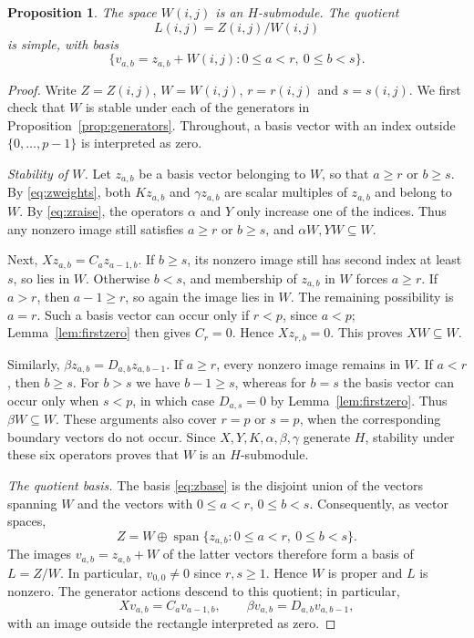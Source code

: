 \documentclass[10pt,oneside]{amsart}
\newcommand{\Span}{\operatorname{span}}
\newtheorem{proposition}{Proposition}[section]
\theoremstyle{definition}
\begin{document}
\begin{proposition}\label{prop:simple}
The space $W(i,j)$ is an $H$-submodule. The quotient
\[
 L(i,j)=Z(i,j)/W(i,j)
\]
is simple, with basis
\[
 \{v_{a,b}=z_{a,b}+W(i,j):0\le a<r,\ 0\le b<s\}.
\]
\end{proposition}
\begin{proof}
Write $Z=Z(i,j)$, $W=W(i,j)$, $r=r(i,j)$ and $s=s(i,j)$.
We first check that $W$ is stable under each of the generators in
Proposition~\ref{prop:generators}. Throughout, a basis vector with an
index outside $\{0,\ldots,p-1\}$ is interpreted as zero.

\smallskip\noindent\emph{Stability of $W$.}
Let $z_{a,b}$ be a basis vector belonging to $W$, so that $a\ge r$
or $b\ge s$. By \eqref{eq:zweights}, both $Kz_{a,b}$ and
$\gamma z_{a,b}$ are scalar multiples of $z_{a,b}$ and belong to $W$.
By \eqref{eq:zraise}, the operators $\alpha$ and $Y$ only increase
one of the indices. Thus any nonzero image still satisfies
$a\ge r$ or $b\ge s$, and $\alpha W,YW\subseteq W$.

Next, $Xz_{a,b}=C_a z_{a-1,b}$. If $b\ge s$, its nonzero image
still has second index at least $s$, so lies in $W$. Otherwise
$b<s$, and membership of $z_{a,b}$ in $W$ forces $a\ge r$.
If $a>r$, then $a-1\ge r$, so again the image lies in $W$.
The remaining possibility is $a=r$. Such a basis vector can occur
only if $r<p$, since $a<p$; Lemma~\ref{lem:firstzero} then gives
$C_r=0$. Hence $Xz_{r,b}=0$. This proves $XW\subseteq W$.

Similarly, $\beta z_{a,b}=D_{a,b}z_{a,b-1}$. If $a\ge r$,
every nonzero image remains in $W$. If $a<r$, then $b\ge s$.
For $b>s$ we have $b-1\ge s$, whereas for $b=s$ the basis vector
can occur only when $s<p$, in which case
$D_{a,s}=0$ by Lemma~\ref{lem:firstzero}. Thus $\beta W\subseteq W$.
These arguments also cover $r=p$ or $s=p$, when the corresponding
boundary vectors do not occur. Since $X,Y,K,\alpha,\beta,\gamma$
generate $H$, stability under these six operators proves that $W$
is an $H$-submodule.

\smallskip\noindent\emph{The quotient basis.}
The basis \eqref{eq:zbase} is the disjoint union of the vectors
spanning $W$ and the vectors with $0\le a<r$, $0\le b<s$.
Consequently, as vector spaces,
\[
 Z=W\oplus\Span\{z_{a,b}:0\le a<r,\ 0\le b<s\}.
\]
The images $v_{a,b}=z_{a,b}+W$ of the latter vectors therefore form
a basis of $L=Z/W$. In particular, $v_{0,0}\ne0$ since $r,s\ge1$.
Hence $W$ is proper and $L$ is nonzero. The generator actions descend
to this quotient; in particular,
\[
 Xv_{a,b}=C_av_{a-1,b},\qquad
 \beta v_{a,b}=D_{a,b}v_{a,b-1},
\]
with an image outside the rectangle interpreted as zero.


\end{proof}
\end{document}
